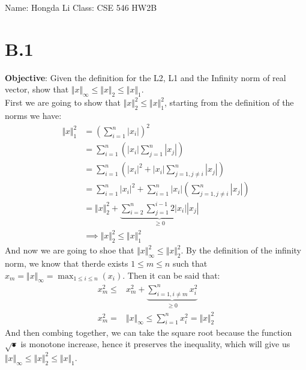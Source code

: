 \documentclass[]{article}
\begin{document}
\begin{center}
    Name: Hongda Li \quad Class: CSE 546 \quad HW2B
\end{center}
\section*{B.1}
    \textbf{Objective}: Given the definition for the L2, L1 and the Infinity norm of real vector, show that $\Vert x\Vert_\infty \le \Vert x\Vert_2 \le \Vert x\Vert_1$. 
    \\
    First we are going to show that $\Vert x\Vert_2^2 \le \Vert x\Vert_1^2$, starting from the definition of the norms we have: 
    \begin{align*}\tag{B.1.1}\label{eqn:B.1.1}
        \Vert x\Vert_1^2 &= 
            \left(
                \sum_{i = 1}^{n} |x_i|
            \right)^2
        \\ 
        &= \sum_{i = 1}^{n}
            \left(
                |x_i|\sum_{j = 1}^{n}
                    |x_j|
            \right)
        \\
        &= 
        \sum_{i = 1}^{n}
            \left(
                |x_i|^2 + 
                |x_i|\sum_{j = 1, j \ne i}^{n}
                    |x_j|
            \right)
        \\
        &= 
        \sum_{i = 1}^{n} |x_i|^2 + \sum_{i = 1}^{n}|x_i|\left(
            \sum_{ j= 1,j \ne i }^{n}
                |x_j|
        \right)
        \\
        &= 
        \Vert x\Vert_2^2 + \underbrace{\sum_{i = 2}^{n}\sum_{j = 1}^{i - 1}2|x_i||x_j|}_{\ge 0}
        \\
        &\implies \Vert x\Vert_2^2 \le \Vert x\Vert_1^2
    \end{align*}
    And now we are going to shoe that $\Vert x\Vert_\infty^2 \le \Vert x\Vert_2^2$. By the definition of the infinity norm, we know that therde exists $1\le m \le n$ such that $x_m = \Vert x\Vert_\infty = \max_{1\le i\le n}(x_i)$. Then it can be said that: 
    \begin{align*}\tag{B.1.2}\label{eqn:B.1.2}
        x_m^2 \le& x_m^2 + \underbrace{\sum_{i = 1, i\ne m}^{n} x_i^2}_{\ge 0}
        \\
        x_m^2 =& \Vert x\Vert_\infty \le \sum_{i = 1}^{n}x_i^2 = \Vert x\Vert_2^2
    \end{align*}
    And then combing together, we can take the square root because the function $\sqrt{\bullet}$ is monotone increase, hence it preserves the inequality, which will give us $\Vert x\Vert_\infty \le \Vert x\Vert_2^2\le \Vert x\Vert_1$.
\end{document}
